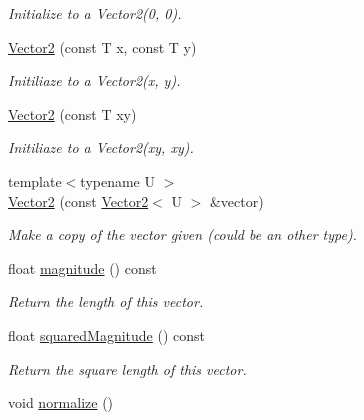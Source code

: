 \begin{DoxyCompactItemize}
\begin{DoxyCompactList}\small\item\em Initialize to a Vector2(0, 0). \end{DoxyCompactList}\item 
\hyperlink{classfuzzy_telegram_1_1_vector2_ae8cc8d26783d6b2d8cbdb3f2cea4c232}{Vector2} (const T x, const T y)
\begin{DoxyCompactList}\small\item\em Initiliaze to a Vector2(x, y). \end{DoxyCompactList}\item 
\hyperlink{classfuzzy_telegram_1_1_vector2_a6077e7a8421118e6aa373d64bedd17b1}{Vector2} (const T xy)
\begin{DoxyCompactList}\small\item\em Initiliaze to a Vector2(xy, xy). \end{DoxyCompactList}\item 
{\footnotesize template$<$typename U $>$ }\\\hyperlink{classfuzzy_telegram_1_1_vector2_a79bc1f0acbb337198bb5cd65233b73e2}{Vector2} (const \hyperlink{classfuzzy_telegram_1_1_vector2}{Vector2}$<$ U $>$ \&vector)
\begin{DoxyCompactList}\small\item\em Make a copy of the vector given (could be an other type). \end{DoxyCompactList}\item 
float \hyperlink{classfuzzy_telegram_1_1_vector2_ab0e054c6edd49d3ae03046f3dd29d799}{magnitude} () const 
\begin{DoxyCompactList}\small\item\em Return the length of this vector. \end{DoxyCompactList}\item 
float \hyperlink{classfuzzy_telegram_1_1_vector2_afbf03a36391a43ead35db0f5586f02e0}{squared\+Magnitude} () const 
\begin{DoxyCompactList}\small\item\em Return the square length of this vector. \end{DoxyCompactList}\item 
void \hyperlink{classfuzzy_telegram_1_1_vector2_a916f54c68020b50e7a5506ca24a5d426}{normalize} ()\hypertarget{classfuzzy_telegram_1_1_vector2_a916f54c68020b50e7a5506ca24a5d426}{}\label{classfuzzy_telegram_1_1_vector2_a916f54c68020b50e7a5506ca24a5d426}


\end{DoxyCompactItemize}
